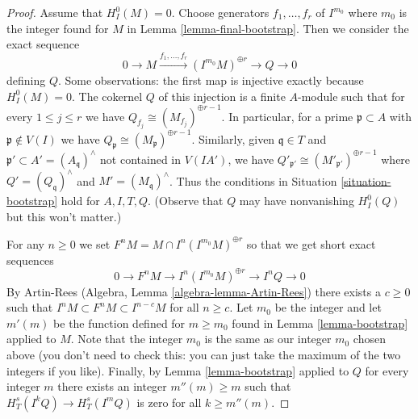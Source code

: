 \begin{proof}
\medskip\noindent
Assume that $H^0_I(M) = 0$. Choose generators
$f_1, \ldots, f_r$ of $I^{m_0}$ where $m_0$ is the
integer found for $M$ in Lemma \ref{lemma-final-bootstrap}.
Then we consider the exact sequence
$$
0 \to M \xrightarrow{f_1, \ldots, f_r}
(I^{m_0}M)^{\oplus r} \to Q \to 0
$$
defining $Q$. Some observations: the first map is injective
exactly because $H^0_I(M) = 0$. The cokernel $Q$ of this injection
is a finite $A$-module such that for every $1 \leq j \leq r$
we have $Q_{f_j} \cong (M_{f_j})^{\oplus r - 1}$.
In particular, for a prime $\mathfrak p \subset A$
with $\mathfrak p \not \in V(I)$ we have
$Q_\mathfrak p \cong (M_\mathfrak p)^{\oplus r - 1}$.
Similarly, given $\mathfrak q \in T$ and
$\mathfrak p' \subset A' = (A_\mathfrak q)^\wedge$
not contained in $V(IA')$, we have
$Q'_{\mathfrak p'} \cong (M'_{\mathfrak p'})^{\oplus r - 1}$
where $Q' = (Q_\mathfrak q)^\wedge$ and $M' = (M_\mathfrak q)^\wedge$.
Thus the conditions in Situation \ref{situation-bootstrap}
hold for $A, I, T, Q$. (Observe that $Q$ may have
nonvanishing $H^0_I(Q)$ but this won't matter.)

\medskip\noindent
For any $n \geq 0$ we set $F^nM = M \cap I^n(I^{m_0}M)^{\oplus r}$
so that we get short exact sequences
$$
0 \to F^nM \to I^n(I^{m_0}M)^{\oplus r} \to I^nQ \to 0
$$
By Artin-Rees (Algebra, Lemma \ref{algebra-lemma-Artin-Rees})
there exists a $c \geq 0$ such that
$I^n M \subset F^nM \subset I^{n - c}M$ for all $n \geq c$.
Let $m_0$ be the integer and let $m'(m)$
be the function defined for $m \geq m_0$
found in Lemma \ref{lemma-bootstrap}
applied to $M$. Note that the integer $m_0$
is the same as our integer $m_0$ chosen above (you don't need to
check this: you can just take the maximum of the two integers if
you like). Finally, by Lemma \ref{lemma-bootstrap}
applied to $Q$ for every integer $m$ there exists an integer
$m''(m) \geq m$ such that $H^s_T(I^kQ) \to H^s_T(I^mQ)$
is zero for all $k \geq m''(m)$.


\end{proof}
